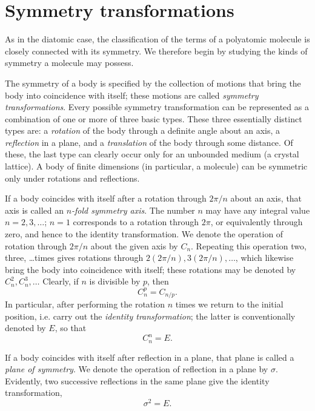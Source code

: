 \section{Symmetry transformations}

As in the diatomic case, the classification of the terms of a polyatomic molecule is closely connected with its symmetry. We therefore begin by studying the kinds of symmetry a molecule may possess.

The symmetry of a body is specified by the collection of motions that bring the body into coincidence with itself; these motions are called \emph{symmetry transformations}. Every possible symmetry transformation can be represented as a combination of one or more of three basic types. These three essentially distinct types are: a \emph{rotation} of the body through a definite angle about an axis, a \emph{reflection} in a plane, and a \emph{translation} of the body through some distance. Of these, the last type can clearly occur only for an unbounded medium (a crystal lattice). A body of finite dimensions (in particular, a molecule) can be symmetric only under rotations and reflections.

If a body coincides with itself after a rotation through $2\pi/n$ about an axis, that axis is called an \emph{$n$-fold symmetry axis}. The number $n$ may have any integral value $n=2,3,\ldots$; $n=1$ corresponds to a rotation through $2\pi$, or equivalently through zero, and hence to the identity transformation. We denote the operation of rotation through $2\pi/n$ about the given axis by $C_n$. Repeating this operation two, three, \ldots times gives rotations through $2(2\pi/n),3(2\pi/n),\ldots$, which likewise bring the body into coincidence with itself; these rotations may be denoted by $C_n^2,C_n^3,\ldots$ Clearly, if $n$ is divisible by $p$, then
\begin{equation}
C_n^p=C_{n/p}.
\tag{91.1}
\end{equation}
In particular, after performing the rotation $n$ times we return to the initial position, i.e. carry out the \emph{identity transformation}; the latter is conventionally denoted by $E$, so that
\begin{equation}
C_n^n=E.
\tag{91.2}
\end{equation}

If a body coincides with itself after reflection in a plane, that plane is called a \emph{plane of symmetry}. We denote the operation of reflection in a plane by $\sigma$. Evidently, two successive reflections in the same plane give the identity transformation,
\begin{equation}
\sigma^2=E.
\tag{91.3}
\end{equation}

